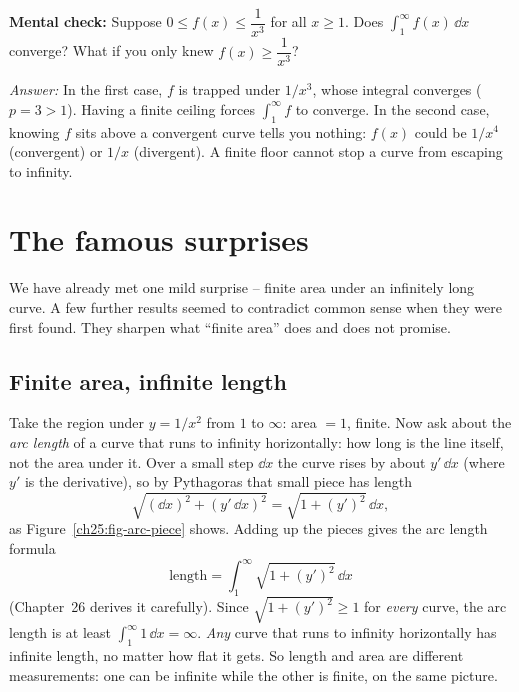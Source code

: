 \begin{recoverybox}
\textbf{Mental check:} Suppose $0 \le f(x) \le \dfrac{1}{x^3}$ for all $x \ge 1$. Does $\displaystyle\int_1^\infty f(x)\,\dd x$ converge? What if you only knew $f(x) \ge \dfrac{1}{x^3}$?

\emph{Answer:} In the first case, $f$ is trapped under $1/x^3$, whose integral converges ($p = 3 > 1$). Having a finite ceiling forces $\int_1^\infty f$ to converge. In the second case, knowing $f$ sits above a convergent curve tells you nothing: $f(x)$ could be $1/x^4$ (convergent) or $1/x$ (divergent). A finite floor cannot stop a curve from escaping to infinity.
\end{recoverybox}

\section{The famous surprises}
\label{ch25:surprises}

We have already met one mild surprise -- finite area under an infinitely long
curve. A few further results seemed to contradict common sense when they were
first found. They sharpen what ``finite area'' does and does not promise.

\subsection{Finite area, infinite length}
\label{ch25:area-vs-length}

\begin{intuitionbox}
Take the region under $y = 1/x^2$ from $1$ to $\infty$: area $= 1$, finite. Now ask
about the \emph{arc length} of a curve that runs to infinity horizontally: how
long is the line itself, not the area under it. Over a small step $\dd x$ the
curve rises by about $y'\,\dd x$ (where $y'$ is the derivative), so by Pythagoras
that small piece has length
\[
  \sqrt{(\dd x)^2 + (y'\,\dd x)^2} = \sqrt{1+(y')^2}\,\dd x,
\]
as Figure~\ref{ch25:fig-arc-piece} shows. Adding up the pieces gives the arc
length formula
\[
  \text{length} = \int_1^\infty \sqrt{1 + (y')^2}\,\dd x
\]
(Chapter~26 derives it carefully). Since $\sqrt{1+(y')^2} \ge 1$ for
\emph{every} curve, the arc length is at least $\int_1^\infty 1\,\dd x = \infty$.
\emph{Any} curve that runs to infinity horizontally has infinite length, no matter
how flat it gets. So length and area are different measurements: one can be
infinite while the other is finite, on the same picture.
\end{intuitionbox}

